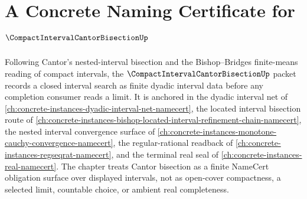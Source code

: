 \chapter{A Concrete Naming Certificate for $\CompactIntervalCantorBisectionUp$}
\label{ch:concrete-instances-compact-interval-cantor-bisection-namecert}

Following Cantor's nested-interval bisection and the Bishop--Bridges finite-means reading of compact intervals, the $\CompactIntervalCantorBisectionUp$ packet records a closed interval search as finite dyadic interval data before any completion consumer reads a limit. It is anchored in the dyadic interval net of \autoref{ch:concrete-instances-dyadic-interval-net-namecert}, the located interval bisection route of \autoref{ch:concrete-instances-bishop-located-interval-refinement-chain-namecert}, the nested interval convergence surface of \autoref{ch:concrete-instances-monotone-cauchy-convergence-namecert}, the regular-rational readback of \autoref{ch:concrete-instances-regseqrat-namecert}, and the terminal real seal of \autoref{ch:concrete-instances-real-namecert}. The chapter treats Cantor bisection as a finite NameCert obligation surface over displayed intervals, not as open-cover compactness, a selected limit, countable choice, or ambient real completeness.


